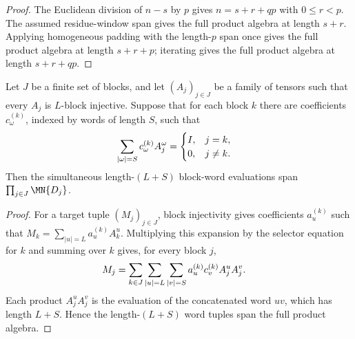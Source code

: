 \begin{proof}
    \leanok
    The Euclidean division of $n-s$ by $p$ gives $n=s+r+qp$ with
    $0\le r<p$. The assumed residue-window span gives the full product algebra
    at length $s+r$. Applying homogeneous padding with the length-$p$ span
    once gives the full product algebra at length $s+r+p$; iterating gives the
    full product algebra at length $s+r+qp$.
\end{proof}

\begin{lemma}
    \label{lem:product_word_span_from_bnt_block_separation}
    \leanok
    Let $J$ be a finite set of blocks, and let $(A_j)_{j\in J}$ be a family of
    tensors such that every $A_j$ is $L$-block injective. Suppose that for each
    block $k$ there are coefficients $c_\omega^{(k)}$, indexed by words of
    length $S$, such that
    \begin{align}
        \sum_{|\omega|=S} c_\omega^{(k)} A_j^\omega
         & =
        \begin{cases}
            I, & j=k,    \\
            0, & j\ne k.
        \end{cases}
        \notag
    \end{align}
    Then the simultaneous length-$(L+S)$ block-word evaluations span
    $\prod_{j\in J} \MN{D_j}$.
\end{lemma}

\begin{proof}
    \leanok
    For a target tuple $(M_j)_{j\in J}$, block injectivity gives coefficients
    $a_u^{(k)}$ such that
    $M_k=\sum_{|u|=L}a_u^{(k)}A_k^u$. Multiplying this expansion by the
    selector equation for $k$ and summing over $k$ gives, for every block $j$,
    \begin{align}
        M_j
         & =
        \sum_{k\in J}\sum_{|u|=L}\sum_{|v|=S}
        a_u^{(k)}c_v^{(k)} A_j^u A_j^v.
        \notag
    \end{align}
    Each product $A_j^uA_j^v$ is the evaluation of the concatenated word $uv$,
    which has length $L+S$. Hence the length-$(L+S)$ word tuples span the full
    product algebra.
\end{proof}
